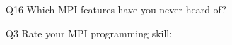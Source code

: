 \begin{description}%
\item{Q16} Which MPI features have you never heard of?%
\item{Q3} Rate your MPI programming skill:%
\end{description}%
